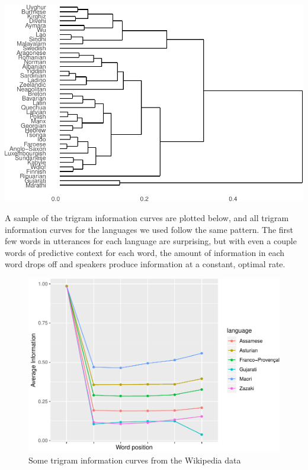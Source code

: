 \documentclass[11pt,]{article}
\begin{document}
\includegraphics{paper_files/figure-latex/unnamed-chunk-7-1.pdf}

A sample of the trigram information curves are plotted below, and all trigram information curves for the languages we used follow the same pattern. The first few words in utterances for each language are surprising, but with even a couple words of predictive context for each word, the amount of information in each word drops off and speakers produce information at a constant, optimal rate.

\begin{figure}
\centering
\includegraphics{paper_files/figure-latex/unnamed-chunk-8-1.pdf}
\caption{\label{fig:unnamed-chunk-8}Some trigram information curves from the Wikipedia data}
\end{figure}
\end{document}
